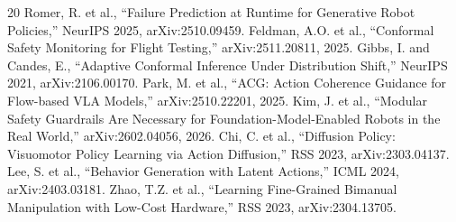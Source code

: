 \documentclass[conference]{IEEEtran}
\begin{document}
\begin{thebibliography}{20}
 Romer, R. et al., ``Failure Prediction at Runtime for Generative Robot Policies,'' NeurIPS 2025, arXiv:2510.09459.
 Feldman, A.O. et al., ``Conformal Safety Monitoring for Flight Testing,'' arXiv:2511.20811, 2025.
 Gibbs, I. and Candes, E., ``Adaptive Conformal Inference Under Distribution Shift,'' NeurIPS 2021, arXiv:2106.00170.
 Park, M. et al., ``ACG: Action Coherence Guidance for Flow-based VLA Models,'' arXiv:2510.22201, 2025.
 Kim, J. et al., ``Modular Safety Guardrails Are Necessary for Foundation-Model-Enabled Robots in the Real World,'' arXiv:2602.04056, 2026.
 Chi, C. et al., ``Diffusion Policy: Visuomotor Policy Learning via Action Diffusion,'' RSS 2023, arXiv:2303.04137.
 Lee, S. et al., ``Behavior Generation with Latent Actions,'' ICML 2024, arXiv:2403.03181.
 Zhao, T.Z. et al., ``Learning Fine-Grained Bimanual Manipulation with Low-Cost Hardware,'' RSS 2023, arXiv:2304.13705.
\end{thebibliography}
\end{document}
